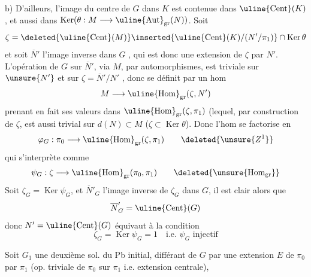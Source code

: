 b) D'ailleurs, l'image du centre de $G$ dans $K$  est
contenue dans $\uline{\operatorname{Cent}}(K)$ , et aussi dans
$\operatorname{Ker}(\theta:M\longrightarrow\uline{\operatorname{Aut}}_{\mathrm{gr}}(N))$. Soit
\[
\zeta=\deleted{\uline{\operatorname{Cent}}(M)}\inserted{\uline{\operatorname{Cent}}(K)/(N'/\pi_1)}\cap\operatorname{Ker}\theta
\]
et soit $\overline{N}'$  l'image inverse dans $G$ ,
qui est donc
une extension de $\zeta$ par $N'$. L'opération de
$G$ sur $\overline{N}'$, via $M$, par automorphismes, est triviale
sur $\unsure{N'}$ et sur $\zeta=\overline{N}'/N'$ , donc se définit par un
hom
\[
M\longrightarrow\uline{\operatorname{Hom}}_{\mathrm{gr}}(\zeta,N')
\]
prenant en fait ses valeurs dans $\uline{\operatorname{Hom}}_{\mathrm{gr}}(\zeta,\pi_1)$
(lequel, par construction de $\zeta$, est aussi trivial
sur $d(N)\subset M$ ($\zeta\subset\operatorname{Ker}\theta$). Donc l'hom
se factorise en
\[
\varphi_G:\pi_0\longrightarrow\uline{\operatorname{Hom}}_{\mathrm{gr}}(\zeta,\pi_1)
\qquad\deleted{\unsure{Z^1}}
\]
qui s'interprète  comme
\[
\psi_G:\zeta\longrightarrow\uline{\operatorname{Hom}}_{\mathrm{gr}}(\pi_0,\pi_1)
\qquad\deleted{\unsure{\operatorname{Hom}_{\mathrm{gr}}}}
\]
Soit $\zeta_G=\operatorname{Ker}\psi_G$, et $\overline{N}'_G$ l'image inverse de
$\zeta_G$ dans $G$, il est clair alors que
\[
\overline{N}'_G=\uline{\operatorname{Cent}}(G)
\]
donc $N'=\uline{\operatorname{Cent}}(G)$ équivaut à la condition
\[
\boxed{\zeta_G=\operatorname{Ker}\psi_G=1\quad\text{i.e. }\psi_G\text{ injectif}}
\]

Soit $G_1$ une deuxième sol. du Pb initial,
différant de $G$ par une extension  $E$ de $\pi_0$ par $\pi_1$
(op. triviale de $\pi_0$ sur $\pi_1$ i.e. extension centrale),


